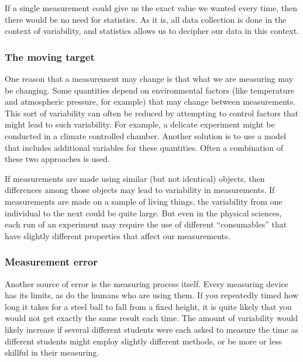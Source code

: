 \documentclass[twoside]{book}\usepackage[]{graphicx}\usepackage[]{xcolor}
\newcounter{example}[section]
\begin{document}
If a single measurement could give us the exact value we wanted 
every time, then there would be no need for statistics.
As it is, all data collection is done in the context of variability,
and statistics allows us to decipher our data in this context.


\subsubsection{The moving target}
One reason that a measurement may change is that what we are measuring
may be changing.  Some quantities depend on environmental factors (like 
temperature and atmospheric pressure, for example) that may change
between measurements.   This sort of variability can often be reduced
by attempting to  control factors that might lead to such variability.
For example, a delicate experiment might be conducted in a
climate controlled chamber.
Another solution is to use a model that includes additional variables 
for these quantities.  Often a combination of these two approaches is used.

If measurements are made using similar (but not identical) objects, then
differences among those objects may lead to variability in measurements.   If
measurements are made on a sample of living things, the variability from one
individual to the next could be quite large.  But even in the physical
sciences, each run of an experiment may require the use of different
``consumables'' that have slightly different properties that affect 
our measurements.

\subsubsection{Measurement error}

Another source of error is the measuring process itself.  Every
measuring device has its limits, as do the humans who are using them.
If you repeatedly timed how long it takes for a steel ball to fall from a fixed 
height, it is quite likely 
that you would not get exactly the same result each time.  The amount of 
variability would likely increase if several different students were 
each asked to measure the time as different students
might employ slightly different methods, or be more or less skillful in 
their measuring.
\end{document}
